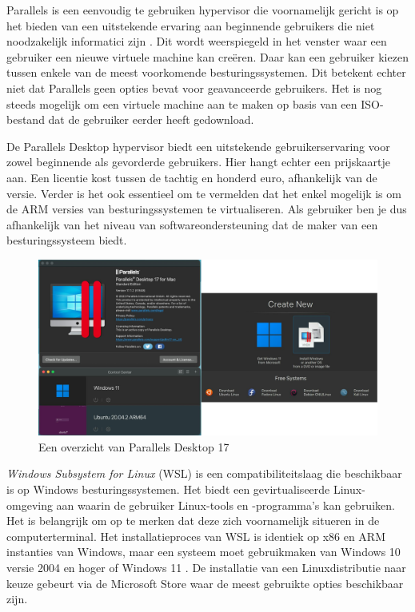 Parallels is een eenvoudig te gebruiken hypervisor die voornamelijk gericht is op het bieden van een uitstekende ervaring aan beginnende gebruikers die niet noodzakelijk informatici zijn \autocite{Parallels2009}. Dit wordt weerspiegeld in het venster waar een gebruiker een nieuwe virtuele machine kan creëren. Daar kan een gebruiker kiezen tussen enkele van de meest voorkomende besturingssystemen. Dit betekent echter niet dat Parallels geen opties bevat voor geavanceerde gebruikers. Het is nog steeds mogelijk om een virtuele machine aan te maken op basis van een ISO-bestand dat de gebruiker eerder heeft gedownload.

De Parallels Desktop hypervisor biedt een uitstekende gebruikerservaring voor zowel beginnende als gevorderde gebruikers. Hier hangt echter een prijskaartje aan. Een licentie kost tussen de tachtig en honderd euro, afhankelijk van de versie. Verder is het ook essentieel om te vermelden dat het enkel mogelijk is om de ARM versies van besturingssystemen te virtualiseren. Als gebruiker ben je dus afhankelijk van het niveau van softwareondersteuning dat de maker van een besturingssysteem biedt.

\begin{figure}[!h]
	\centering
	\includegraphics[width=\linewidth]{img/parallels.jpg}
	\caption{Een overzicht van Parallels Desktop 17}
\end{figure}

\textit{Windows Subsystem for Linux} (WSL) is een compatibiliteitslaag die beschikbaar is op Windows besturingssystemen. Het biedt een gevirtualiseerde Linux-omgeving aan waarin de gebruiker Linux-tools en -programma’s kan gebruiken. Het is belangrijk om op te merken dat deze zich voornamelijk situeren in de computerterminal. Het installatieproces van WSL is identiek op x86 en ARM instanties van Windows, maar een systeem moet gebruikmaken van Windows 10 versie 2004 en hoger of Windows 11 \autocite{Microsoft2021}. De installatie van een Linuxdistributie naar keuze gebeurt via de Microsoft Store waar de meest gebruikte opties beschikbaar zijn. 

